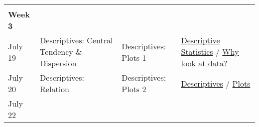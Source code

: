 \documentclass[
]{book}
\begin{document}
\begin{longtable}[]{@{}llll@{}}
\begin{minipage}[t]{0.18\columnwidth}
\end{minipage}\tabularnewline
\begin{minipage}[t]{0.09\columnwidth}\raggedright
\textbf{Week 3}\strut
\end{minipage} & \begin{minipage}[t]{0.32\columnwidth}\raggedright
\strut
\end{minipage} & \begin{minipage}[t]{0.29\columnwidth}\raggedright
\strut
\end{minipage} & \begin{minipage}[t]{0.18\columnwidth}\raggedright
\strut
\end{minipage}\tabularnewline
\begin{minipage}[t]{0.09\columnwidth}\raggedright
July 19\strut
\end{minipage} & \begin{minipage}[t]{0.32\columnwidth}\raggedright
Descriptives: Central Tendency \& Dispersion\strut
\end{minipage} & \begin{minipage}[t]{0.29\columnwidth}\raggedright
Descriptives: Plots 1\strut
\end{minipage} & \begin{minipage}[t]{0.18\columnwidth}\raggedright
\href{https://learningstatisticswithr.com/book/descriptives.html}{Descriptive Statistics} / \href{https://socvis.co/lookatdata.html\#lookatdata}{Why look at data?}\strut
\end{minipage}\tabularnewline
\begin{minipage}[t]{0.09\columnwidth}\raggedright
July 20\strut
\end{minipage} & \begin{minipage}[t]{0.32\columnwidth}\raggedright
Descriptives: Relation\strut
\end{minipage} & \begin{minipage}[t]{0.29\columnwidth}\raggedright
Descriptives: Plots 2\strut
\end{minipage} & \begin{minipage}[t]{0.18\columnwidth}\raggedright
\href{https://learningstatisticswithr.com/book/descriptives.html}{Descriptives} / \href{https://learningstatisticswithr.com/book/graphics.html}{Plots}\strut
\end{minipage}\tabularnewline
\begin{minipage}[t]{0.09\columnwidth}\raggedright
July 22\strut
\end{minipage} & \begin{minipage}[t]{0.32\columnwidth}\raggedright

\end{minipage}
\end{longtable}
\end{document}
